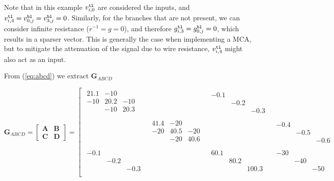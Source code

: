 \documentclass[journal,onecolumn]{IEEEtran}
\newcommand{\vtt}[1]{%
  \text{\normalfont\ttfamily\detokenize{#1}}%
}
\newcommand{\xx}{3}
\newcommand{\yy}{2}
\begin{document}
Note that in this example $v^\vtt{tl}_{i,0}$ are considered the inputs, and $v^\vtt{tl}_{i,\fpeval{\xx+1}} = v^\vtt{bl}_{0,j}=v^\vtt{bl}_{\fpeval{\yy+1},j} = 0$. Similarly, for the branches that are not present, we can consider infinite resistance ($r^{-1} = g = 0$), and therefore $g^\vtt{tl}_{i,\xx} = g^\vtt{bl}_{0,j} = 0$, which results in a sparser vector. This is generally the case when implementing a MCA, but to mitigate the attenuation of the signal due to wire resistance, $v^\vtt{tl}_{i,\fpeval{\xx+1}}$ might also act as an input.

From (\ref{eq:abcd}) we extract $\mathbf{G}_{ABCD}$

$$
\mathbf{G}_{ABCD} = \begin{bmatrix} \mathbf{A} & \mathbf{B} \\ \mathbf{C} & \mathbf{D} \end{bmatrix} = 
\left[
\begin{array}{cc|cc}
    \begin{matrix}
        21.1 & -10         \\
        -10  & 20.2 & -10  \\
             & -10  & 20.3 \\
    \end{matrix} && \begin{matrix} -0.1 \\ & -0.2 \\ && -0.3 \end{matrix} & \\
    & \begin{matrix}
        41.4 & -20         \\
        -20  & 40.5 & -20  \\
             & -20  & 40.6 \\
    \end{matrix} && \begin{matrix} -0.4 \\ & -0.5 \\ && -0.6 \end{matrix} \\ \hline
    \begin{matrix} -0.1 \\ & -0.2 \\ && -0.3 \end{matrix} && \begin{matrix} 60.1 \\ & 80.2 \\ && 100.3 \end{matrix} & \begin{matrix} -30 \\ & -40 \\ && -50 \end{matrix} \\

\end{array}$$
\end{document}
